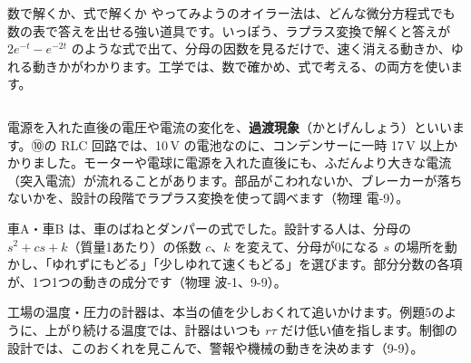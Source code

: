 \begin{column}{数で解くか、式で解くか}
やってみようのオイラー法は、どんな微分方程式でも数の表で答えを出せる強い道具です。いっぽう、ラプラス変換で解くと答えが $2e^{-t}-e^{-2t}$ のような式で出て、分母の因数を見るだけで、速く消える動きか、ゆれる動きかがわかります。工学では、数で確かめ、式で考える、の両方を使います。
\end{column}

\begin{butsuri}
\noindent\begin{minipage}[c]{0.64\linewidth}
\raggedright
電源を入れた直後の電圧や電流の変化を、\textbf{過渡現象}（かとげんしょう）といいます。⑩の RLC 回路では、10\,V の電池なのに、コンデンサーに一時 17\,V 以上かかりました。モーターや電球に電源を入れた直後にも、ふだんより大きな電流（突入電流）が流れることがあります。部品がこわれないか、ブレーカーが落ちないかを、設計の段階でラプラス変換を使って調べます（物理 電-9）。
\end{minipage}\hfill
\begin{minipage}[c]{0.32\linewidth}
\centering
{}
\end{minipage}
\par\vspace{4pt}
車A・車B は、車のばねとダンパーの式でした。設計する人は、分母の $s^2+cs+k$（質量1あたり）の係数 $c$、$k$ を変えて、分母が0になる $s$ の場所を動かし、「ゆれずにもどる」「少しゆれて速くもどる」を選びます。部分分数の各項が、1つ1つの動きの成分です（物理 波-1、9-9）。
\par\vspace{4pt}
工場の温度・圧力の計器は、本当の値を少しおくれて追いかけます。例題5のように、上がり続ける温度では、計器はいつも $r\tau$ だけ低い値を指します。制御の設計では、このおくれを見こんで、警報や機械の動きを決めます（9-9）。
\end{butsuri}






